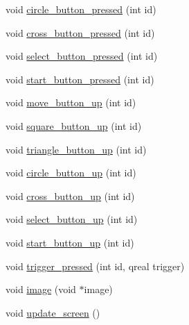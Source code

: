 \begin{DoxyCompactItemize}
\item 
void \hyperlink{class_p_s_move_controller_thread_a3bef68fb8d8576e8eed751ad95170c30}{circle\-\_\-button\-\_\-pressed} (int id)
\item 
void \hyperlink{class_p_s_move_controller_thread_a1caa899fd1f7be15794ee25823fa27dc}{cross\-\_\-button\-\_\-pressed} (int id)
\item 
void \hyperlink{class_p_s_move_controller_thread_ab0010c6e0397bcca8eaeef6b32b53b79}{select\-\_\-button\-\_\-pressed} (int id)
\item 
void \hyperlink{class_p_s_move_controller_thread_a4444b470ff0fe5395d7272670f18fd0f}{start\-\_\-button\-\_\-pressed} (int id)
\item 
void \hyperlink{class_p_s_move_controller_thread_a470b90615000e1736a99147758d91910}{move\-\_\-button\-\_\-up} (int id)
\item 
void \hyperlink{class_p_s_move_controller_thread_a810ebbce1a541450b6b08306650ef519}{square\-\_\-button\-\_\-up} (int id)
\item 
void \hyperlink{class_p_s_move_controller_thread_a09f407e4ffcdc3a36a10bd313aae3d7b}{triangle\-\_\-button\-\_\-up} (int id)
\item 
void \hyperlink{class_p_s_move_controller_thread_ab4eda55e1704d8a4fbd2fb7442b0a05f}{circle\-\_\-button\-\_\-up} (int id)
\item 
void \hyperlink{class_p_s_move_controller_thread_a778fe6dd1cdb162f1b5078f5bb435579}{cross\-\_\-button\-\_\-up} (int id)
\item 
void \hyperlink{class_p_s_move_controller_thread_afb4702d978f25003ea7b399da66caba6}{select\-\_\-button\-\_\-up} (int id)
\item 
void \hyperlink{class_p_s_move_controller_thread_aef6e7cd49d14e88a9355f48cfc0520d8}{start\-\_\-button\-\_\-up} (int id)
\item 
void \hyperlink{class_p_s_move_controller_thread_aaa3a2937d023c789c7a0008b1eef67d5}{trigger\-\_\-pressed} (int id, qreal trigger)
\item 
void \hyperlink{class_p_s_move_controller_thread_a16c2e82e2e4ac257dcd08acd29786590}{image} (void $\ast$image)
\item 
void \hyperlink{class_p_s_move_controller_thread_ac72baf21165fa2d16e2fa471d07184e2}{update\-\_\-screen} ()
\end{DoxyCompactItemize}
